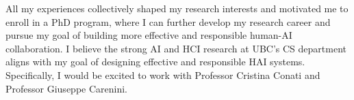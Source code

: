 


All my experiences collectively shaped my research interests and motivated me to enroll in a PhD program, where I can further develop my research career and pursue my goal of building more effective and responsible human-AI collaboration. I believe the strong AI and HCI research at UBC's CS department aligns with my goal of designing effective and responsible HAI systems. Specifically, I would be excited to work with Professor Cristina Conati and Professor Giuseppe Carenini.
